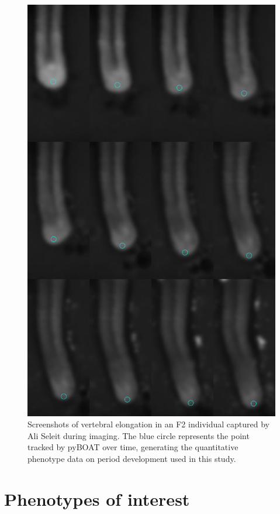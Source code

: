 \documentclass[
]{book}
\begin{document}
\begin{figure}
\includegraphics[width=1\linewidth]{figs/somites/ali_compiled_somite_elong} \caption{Screenshots of vertebral elongation in an F2 individual captured by Ali Seleit during imaging. The blue circle represents the point tracked by pyBOAT over time, generating the quantitative phenotype data on period development used in this study.}\label{fig:somite-period-ali}
\end{figure}

\cleardoublepage

\hypertarget{somite-phenotype}{%
\section{Phenotypes of interest}\label{somite-phenotype}}
\end{document}
